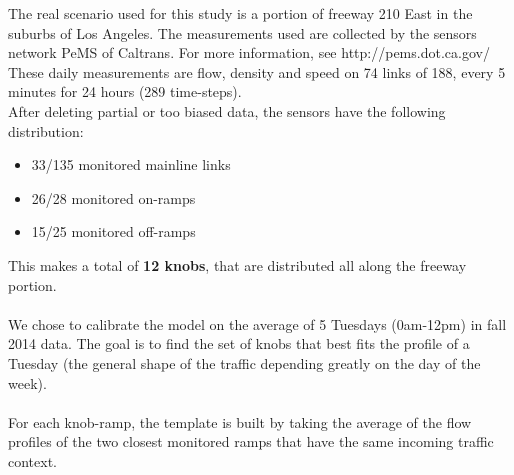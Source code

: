 The real scenario used for this study is a portion of freeway 210 East in the suburbs of Los Angeles. The measurements used are collected by the sensors network PeMS of Caltrans. For more information, see http://pems.dot.ca.gov/\\
These daily measurements are flow, density and speed on 74 links of 188, every 5 minutes for 24 hours (289 time-steps).\\
After deleting partial or too biased data, the sensors have the following distribution:
\begin{itemize}
	\item 33/135 monitored mainline links
	\item 26/28 monitored on-ramps
	\item 15/25 monitored off-ramps
\end{itemize}
This makes a total of \textbf{12 knobs}, that are distributed all along the freeway portion.\\
\\
We chose to calibrate the model on the average of 5 Tuesdays (0am-12pm) in fall 2014 data. The goal is to find the set of knobs that best fits the profile of a Tuesday (the general shape of the traffic depending greatly on the day of the week).\\
\\
For each knob-ramp, the template is built by taking the average of the flow profiles of the two closest monitored ramps that have the same incoming traffic context. 